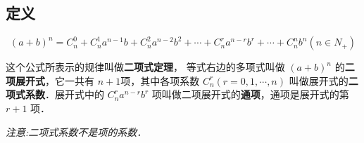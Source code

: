 
\begin{issues}
\issueDraft
\end{issues}

\subsection{定义}
\begin{equation}
(a + b)^n = C_n^0 + C_n^1a^{n- 1}b + C_n^2a^{n- 2}b^2 + \cdots + C_n^ra^{n-r}b^r + \cdots + C_n^nb^n(n\in N_{+})
\end{equation}

这个公式所表示的规律叫做\textbf{二项式定理}，
等式右边的多项式叫做 $(a+b)^n$ 的\textbf{二项展开式}，它一共有 $n+1$项，其中各项系数 $C_n^r(r = 0, 1, \cdots, n)$ 叫做展开式的\textbf{二项式系数}．展开式中的 $C_n^ra^{n-r}b^r$ 项叫做二项展开式的\textbf{通项}，通项是展开式的第 $r+1$ 项．

\textsl{注意:二项式系数不是项的系数．}